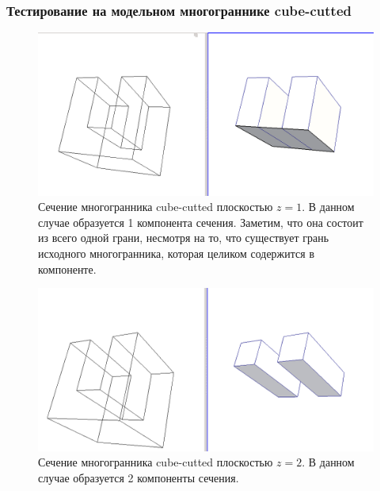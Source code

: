 \documentclass[a4paper,12pt, titlepage]{article}
\begin{document}
\subsubsection{Тестирование на модельном многограннике cube-cutted}
	\begin{flushleft}
		\begin{figure}[ht]
		    \includegraphics[width=15cm]{cube-cutted/cube-cutted-1.png}
		    \caption{Сечение многогранника cube-cutted плоскостью $z = 1$. В данном случае образуется 1
		компонента сечения. Заметим, что она состоит из всего одной грани, несмотря на то, что
		существует грань исходного многогранника, которая целиком содержится в компоненте.}
		    \label{cube-cutted-1}
		\end{figure}
		
	\end{flushleft}
	\begin{flushleft}
		\begin{figure}[ht]
		    \includegraphics[width=15cm]{cube-cutted/cube-cutted-2.png}
		    \caption{Сечение многогранника cube-cutted плоскостью $z = 2$. В данном случае образуется 2
		компоненты сечения.}
		    \label{cube-cutted-2}
		\end{figure}
	\end{flushleft}
\end{document}
